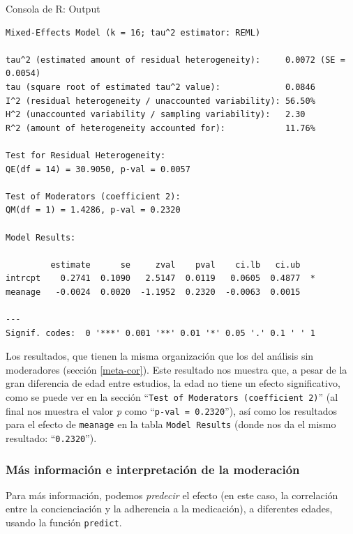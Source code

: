 \documentclass[
  bookmarksnumbered]{article}
\begin{document}
\begin{ROut}{Consola de R: Output~\thetcbcounter}
                \begin{footnotesize}
                \begin{verbatim} 
Mixed-Effects Model (k = 16; tau^2 estimator: REML)

tau^2 (estimated amount of residual heterogeneity):     0.0072 (SE = 0.0054)
tau (square root of estimated tau^2 value):             0.0846
I^2 (residual heterogeneity / unaccounted variability): 56.50%
H^2 (unaccounted variability / sampling variability):   2.30
R^2 (amount of heterogeneity accounted for):            11.76%

Test for Residual Heterogeneity:
QE(df = 14) = 30.9050, p-val = 0.0057

Test of Moderators (coefficient 2):
QM(df = 1) = 1.4286, p-val = 0.2320

Model Results:

         estimate      se     zval    pval    ci.lb   ci.ub    
intrcpt    0.2741  0.1090   2.5147  0.0119   0.0605  0.4877  * 
meanage   -0.0024  0.0020  -1.1952  0.2320  -0.0063  0.0015    

---
Signif. codes:  0 '***' 0.001 '**' 0.01 '*' 0.05 '.' 0.1 ' ' 1
 \end{verbatim}
                \end{footnotesize}
                \end{ROut}

Los resultados, que tienen la misma organización que los del análisis sin moderadores (sección \ref{meta-cor}). Este resultado nos muestra que, a pesar de la gran diferencia de edad entre estudios, la edad no tiene un efecto significativo, como se puede ver en la sección ``\texttt{Test\ of\ Moderators\ (coefficient\ 2)}'' (al final nos muestra el valor \emph{p} como ``\texttt{p-val =  0.2320}''), así como los resultados para el efecto de \texttt{meanage} en la tabla \texttt{Model\ Results} (donde nos da el mismo resultado: ``\texttt{0.2320}'').

\hypertarget{pred-mods}{%
\subsubsection{Más información e interpretación de la moderación}\label{pred-mods}}

Para más información, podemos \emph{predecir} el efecto (en este caso, la correlación entre la concienciación y la adherencia a la medicación), a diferentes edades, usando la función \texttt{predict}.
\end{document}

